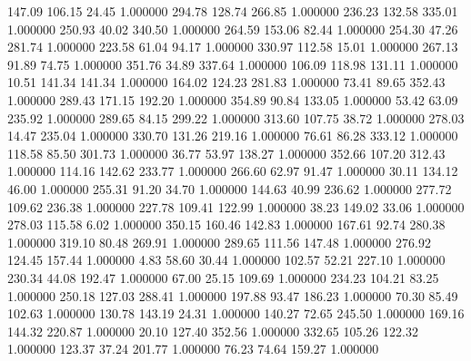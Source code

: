     147.09    106.15     24.45  1.000000
    294.78    128.74    266.85  1.000000
    236.23    132.58    335.01  1.000000
    250.93     40.02    340.50  1.000000
    264.59    153.06     82.44  1.000000
    254.30     47.26    281.74  1.000000
    223.58     61.04     94.17  1.000000
    330.97    112.58     15.01  1.000000
    267.13     91.89     74.75  1.000000
    351.76     34.89    337.64  1.000000
    106.09    118.98    131.11  1.000000
     10.51    141.34    141.34  1.000000
    164.02    124.23    281.83  1.000000
     73.41     89.65    352.43  1.000000
    289.43    171.15    192.20  1.000000
    354.89     90.84    133.05  1.000000
     53.42     63.09    235.92  1.000000
    289.65     84.15    299.22  1.000000
    313.60    107.75     38.72  1.000000
    278.03     14.47    235.04  1.000000
    330.70    131.26    219.16  1.000000
     76.61     86.28    333.12  1.000000
    118.58     85.50    301.73  1.000000
     36.77     53.97    138.27  1.000000
    352.66    107.20    312.43  1.000000
    114.16    142.62    233.77  1.000000
    266.60     62.97     91.47  1.000000
     30.11    134.12     46.00  1.000000
    255.31     91.20     34.70  1.000000
    144.63     40.99    236.62  1.000000
    277.72    109.62    236.38  1.000000
    227.78    109.41    122.99  1.000000
     38.23    149.02     33.06  1.000000
    278.03    115.58      6.02  1.000000
    350.15    160.46    142.83  1.000000
    167.61     92.74    280.38  1.000000
    319.10     80.48    269.91  1.000000
    289.65    111.56    147.48  1.000000
    276.92    124.45    157.44  1.000000
      4.83     58.60     30.44  1.000000
    102.57     52.21    227.10  1.000000
    230.34     44.08    192.47  1.000000
     67.00     25.15    109.69  1.000000
    234.23    104.21     83.25  1.000000
    250.18    127.03    288.41  1.000000
    197.88     93.47    186.23  1.000000
     70.30     85.49    102.63  1.000000
    130.78    143.19     24.31  1.000000
    140.27     72.65    245.50  1.000000
    169.16    144.32    220.87  1.000000
     20.10    127.40    352.56  1.000000
    332.65    105.26    122.32  1.000000
    123.37     37.24    201.77  1.000000
     76.23     74.64    159.27  1.000000
